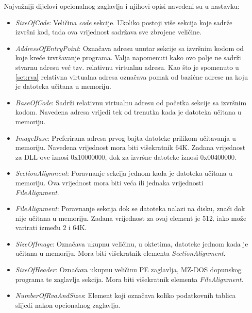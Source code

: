 \documentclass[times, utf8, diplomski, numeric]{fer}
\begin{document}
Najvažniji dijelovi opcionalnog zaglavlja i njihovi opisi			%
navedeni su u nastavku:

\begin{itemize}
\item \emph{SizeOfCode}: Veličina \emph{code} sekcije. Ukoliko
postoji više sekcija koje sadrže izvršni kod, tada ova vrijednost
sadržava sve zbrojene veličine.

\item \emph{AddressOfEntryPoint}: Označava adresu unutar sekcije
sa izvršnim kodom od koje kreće izvršavanje programa. Valja
napomenuti kako ovo polje ne sadrži stvarnu adresu već tzv.
relativnu virtualnu adresu. Kao što je spomenuto u \ref{sct:rva}
relativna virtualna adresa označava pomak od bazične adrese na
koju je datoteka učitana u memoriju.

\item \emph{BaseOfCode}: Sadrži relativnu virtualnu adresu od
početka sekcije sa izvršnim kodom. Navedena adresa vrijedi tek od
trenutka kada je datoteka učitana u memoriju.

\item \emph{ImageBase}: Preferirana adresa prvog bajta datoteke
prilikom učitavanja u memoriju. Navedena vrijednost mora biti
višekratnik 64K. Zadana vrijednost za DLL-ove iznosi 0x10000000,
dok za izvršne datoteke iznosi 0x00400000.

\item \emph{SectionAlignment}: Poravnanje sekcija jednom kada je
datoteka učitana u memoriju. Ova vrijednost mora biti veća ili
jednaka vrijednosti \emph{FileAlignment}.

\item \emph{FileAlignment}: Poravnanje sekcija dok se datoteka
nalazi na disku, znači dok nije učitana u memoriju. Zadana
vrijednost za ovaj element je 512, iako može varirati između 2 i
64K.

\item \emph{SizeOfImage}: Označava ukupnu veličinu, u oktetima,
datoteke jednom kada je učitana u memoriju. Mora biti višekratnik
elementa \emph{SectionAlignment}.

\item \emph{SizeOfHeader}: Označava ukupnu veličinu PE zaglavlja,
MZ-DOS dopunskog programa te zaglavlja sekcija. Mora biti
višekratnik elementa \emph{FileAlignment}.

\item \emph{NumberOfRvaAndSizes}: Element koji označava koliko
podatkovnih tablica slijedi nakon opcionalnog zaglavlja.
\end{itemize}
\end{document}
